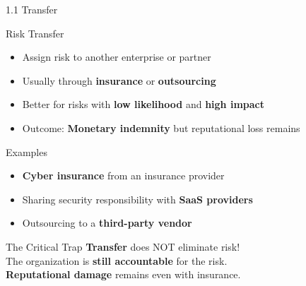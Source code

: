 \documentclass{beamer}
\begin{document}
	\begin{frame}{1.1 Transfer}
		\begin{block}{Risk Transfer}
			\begin{itemize}
				\item Assign risk to another enterprise or partner
				\item Usually through \textbf{insurance} or \textbf{outsourcing}
				\item Better for risks with \textbf{low likelihood} and \textbf{high impact}
				\item Outcome: \textbf{Monetary indemnity} but reputational loss remains
			\end{itemize}
		\end{block}
		
		\begin{block}{Examples}
			\begin{itemize}
				\item \textbf{Cyber insurance} from an insurance provider
				\item Sharing security responsibility with \textbf{SaaS providers}
				\item Outsourcing to a \textbf{third-party vendor}
			\end{itemize}
		\end{block}
		
		\begin{alertblock}{The Critical Trap}
			\textbf{Transfer} does NOT eliminate risk! \\
			The organization is \textbf{still accountable} for the risk. \\
			\textbf{Reputational damage} remains even with insurance.
		\end{alertblock}
	\end{frame}
	
\end{document}
